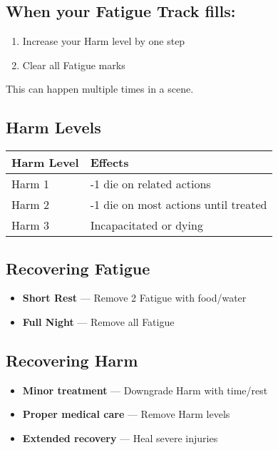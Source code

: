 \documentclass[11pt,twoside,openany]{book}
\begin{document}
\subsection*{When your Fatigue Track fills:}
\begin{enumerate}
\item Increase your Harm level by one step
\item Clear all Fatigue marks
\end{enumerate}

This can happen multiple times in a scene.

\subsection*{Harm Levels}

\begin{center}
\begin{tabular}{|l|l|}
\hline
\textbf{Harm Level} & \textbf{Effects} \\
\hline
Harm 1 & -1 die on related actions \\
Harm 2 & -1 die on most actions until treated \\
Harm 3 & Incapacitated or dying \\
\hline
\end{tabular}
\end{center}

\subsection*{Recovering Fatigue}
\begin{itemize}
\item \textbf{Short Rest} — Remove 2 Fatigue with food/water
\item \textbf{Full Night} — Remove all Fatigue
\end{itemize}

\subsection*{Recovering Harm}
\begin{itemize}
\item \textbf{Minor treatment} — Downgrade Harm with time/rest
\item \textbf{Proper medical care} — Remove Harm levels
\item \textbf{Extended recovery} — Heal severe injuries
\end{itemize}
\end{document}
